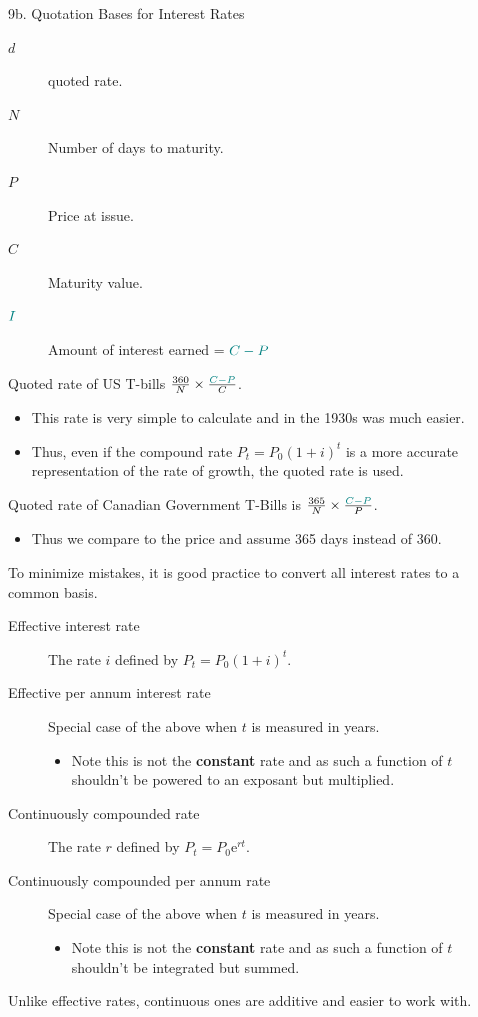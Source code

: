 \begin{CHPT_SUMM_AUTO}[label = {L.-9b}]{9b. Quotation Bases for Interest Rates}
\begin{description}
	\item[$d$]	quoted rate.
	\item[$N$]	Number of days to maturity.
	\item[$P$]	Price at issue.
	\item[$C$]	Maturity value.
	\item[$\textcolor{teal}{I}$]	Amount of interest earned = $\textcolor{teal}{C - P}$
\end{description}
Quoted rate of US T-bills $\frac{360}{N}\times \frac{\textcolor{teal}{C - P}}{C}$. 
\begin{itemize}[leftmargin = *]
	\item	This rate is very simple to calculate and in the 1930s was much easier.
	\item	Thus, even if the compound rate $P_{t} = P_{0}(1 + i)^{t}$ is a more accurate representation of the rate of growth, the quoted rate is used.
\end{itemize}
Quoted rate of Canadian Government T-Bills is $\frac{365}{N}\times \frac{\textcolor{teal}{C - P}}{P}$. 
\begin{itemize}[leftmargin = *]
	\item	Thus we compare to the price and assume 365 days instead of 360.
\end{itemize}

To minimize mistakes, it is good practice to convert all interest rates to a common basis.
\begin{description}
	\item[Effective interest rate]	The rate $i$ defined by $P_{t} = P_{0}(1 + i)^{t}$.
	\item[Effective per annum interest rate]	Special case of the above when $t$ is measured in years.
		\begin{itemize}[leftmargin = *]
		\item	Note this is not the \textbf{constant} rate and as such a function of $t$ shouldn't be powered to an exposant but multiplied.
		\end{itemize}
	\item[Continuously compounded rate]	The rate $r$ defined by $P_{t} = P_{0} \textrm{e}^{rt}$.
	\item[Continuously compounded per annum rate]	Special case of the above when $t$ is measured in years.
		\begin{itemize}[leftmargin = *]
		\item	Note this is not the \textbf{constant} rate and as such a function of $t$ shouldn't be integrated but summed.
		\end{itemize}
\end{description}
Unlike effective rates, continuous ones are additive and easier to work with. 
\end{CHPT_SUMM_AUTO}


